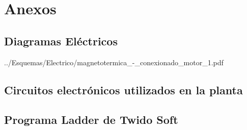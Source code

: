 \chapter{Anexos}
\label{ch:anexos}


\cleardoublepage
\section{Diagramas Eléctricos}
\label{anexo:diag}

{../Esquemas/Electrico/magnetotermica_-_conexionado_motor_1.pdf}




\cleardoublepage
\section{Circuitos electrónicos utilizados en la planta}
\label{anexo:circuitos}




\section{Programa Ladder de Twido Soft}
\label{anexo:programaLadder}
